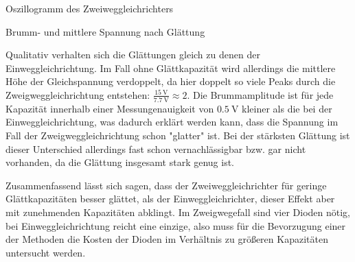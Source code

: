 \documentclass{article}
\theoremstyle{definition}
\begin{document}
\begin{aufgabe}{Oszillogramm des Zweiweggleichrichters}
\begin{table}[H]
        \caption{Brumm- und mittlere Spannung nach Glättung}
    \end{table}
    \auswertung
    Qualitativ verhalten sich die Glättungen gleich zu denen der Einweggleichrichtung. Im Fall ohne Glättkapazität wird allerdings die mittlere Höhe der Gleichspannung verdoppelt, da hier doppelt so viele Peaks durch die Zweigweggleichrichtung entstehen: $\frac{\SI{15}{\volt}}{\SI{7.7}{\volt}} \approx 2$. Die Brummamplitude ist für jede Kapazität innerhalb einer Messungenauigkeit von $\SI{0.5}{\volt}$ kleiner als die bei der Einweggleichrichtung, was dadurch erklärt werden kann, dass die Spannung im Fall der Zweigweggleichrichtung schon "glatter" ist. Bei der stärksten Glättung ist dieser Unterschied allerdings fast schon vernachlässigbar bzw. gar nicht vorhanden, da die Glättung insgesamt stark genug ist. 

    Zusammenfassend lässt sich sagen, dass der Zweiweggleichrichter für geringe Glättkapazitäten besser glättet, als der Einweggleichrichter, dieser Effekt aber mit zunehmenden Kapazitäten abklingt. Im Zweigwegefall sind vier Dioden nötig, bei Einweggleichrichtung reicht eine einzige, also muss für die Bevorzugung einer der Methoden die Kosten der Dioden im Verhältnis zu größeren Kapazitäten untersucht werden.

\end{aufgabe}
\clearpage
\end{document}
